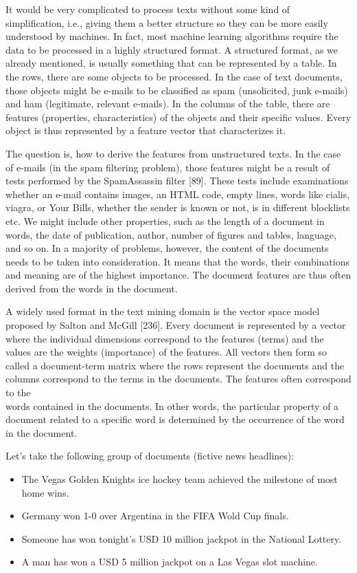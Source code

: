 \documentclass[11pt,openany,executivepaper]{book}
\begin{document}
It would be very complicated to process texts without some kind of simplification, i.e., giving them a better structure so they can be more easily understood by machines. In fact, most machine learning algorithms require the data to be processed in a highly structured format. A structured format, as we already mentioned, is usually something that can be represented by a table. In the rows, there are some objects to be processed. In the case of text documents, those objects might be e-mails to be classified as spam (unsolicited, junk e-mails) and ham (legitimate, relevant e-mails). In the columns of the table, there are features (properties, characteristics) of the objects and their specific values. Every object is thus represented by a feature vector that characterizes it.

The question is, how to derive the features from unstructured texts. In the case of e-mails (in the spam filtering problem), those features might be a result of tests performed by the SpamAssassin filter [89]. These tests include examinations whether an e-mail contains images, an HTML code, empty lines, words like cialis, viagra, or Your Bills, whether the sender is known or not, is in different blocklists etc. We might include other properties, such as the length of a document in words, the date of publication, author, number of figures and tables, language, and so on. In a majority of problems, however, the content of the documents needs to be taken into consideration. It means that the words, their combinations and meaning are of the highest importance. The document features are thus often derived from the words in the document.

A widely used format in the text mining domain is the vector space model proposed by Salton and McGill [236]. Every document is represented by a vector where the individual dimensions correspond to the features (terms) and the values are the weights (importance) of the features. All vectors then form so called a document-term matrix where the rows represent the documents and the columns correspond to the terms in the documents. The features often correspond to the\\
words contained in the documents. In other words, the particular property of a document related to a specific word is determined by the occurrence of the word in the document.

Let's take the following group of documents (fictive news headlines):

\begin{itemize}
  \itshape
  \item The Vegas Golden Knights ice hockey team achieved the milestone of most home wins.
  \item Germany won 1-0 over Argentina in the FIFA Wold Cup finals.
  \item Someone has won tonight's USD 10 million jackpot in the National Lottery.
  \item A man has won a USD 5 million jackpot on a Las Vegas slot machine.
\end{itemize}
\end{document}
